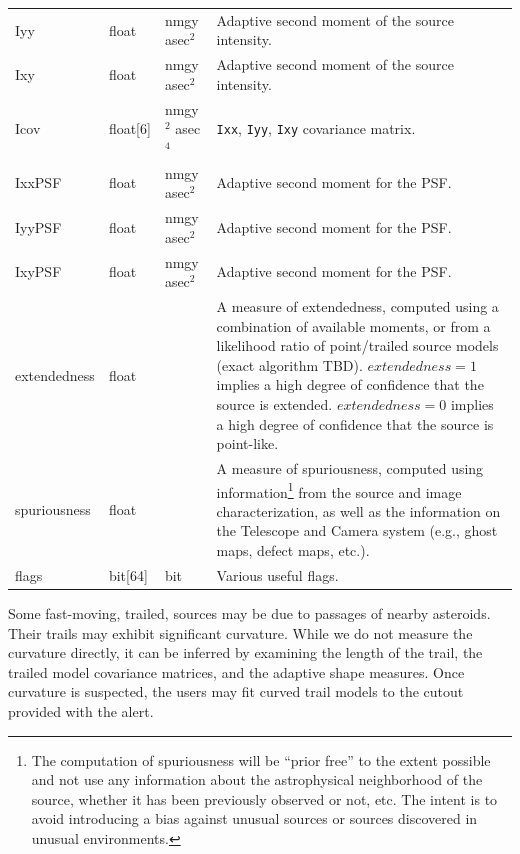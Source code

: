 \documentclass[12pt]{article}
\begin{document}
\begin{center}
\begin{longtable}{p{3cm}p{2cm}p{2cm}p{5cm}}
Iyy & float & nmgy asec$^{2}$ & Adaptive second moment of the source intensity. \\

Ixy & float & nmgy asec$^{2}$ & Adaptive second moment of the source intensity. \\

Icov & float[6] & nmgy$^{2}$ asec$^{4}$ & {\tt Ixx}, {\tt Iyy}, {\tt Ixy} covariance matrix. \\

IxxPSF & float & nmgy asec$^{2}$ & Adaptive second moment for the PSF. \\

IyyPSF & float & nmgy asec$^{2}$ & Adaptive second moment for the PSF. \\

IxyPSF & float & nmgy asec$^{2}$ & Adaptive second moment for the PSF. \\

extendedness & float & ~ & A measure of extendedness, computed using a combination of available moments, or from a likelihood ratio of point/trailed source models (exact algorithm TBD). $extendedness=1$ implies a high degree of confidence that the source is extended. $extendedness=0$ implies a high degree of confidence that the source is point-like. \\

spuriousness & float & ~ & A measure of spuriousness, computed using information\footnote{The computation
of spuriousness will be “prior free” to the extent possible and not use any information about the astrophysical neighborhood of the source, whether it has been previously observed or not, etc. The intent is to avoid introducing
a bias against unusual sources or sources discovered in unusual environments.}
from the source and image characterization, as well as the information on the Telescope and Camera system
(e.g., ghost maps, defect maps, etc.).
\\

flags & bit[64] & bit & Various useful flags.  \\ \hline
\end{longtable}
\end{center}

Some fast-moving, trailed, sources may be due to passages of nearby asteroids. Their trails may exhibit significant curvature.
While we do not measure the curvature directly, it can be inferred by examining the length of the trail, the trailed model covariance matrices, and the adaptive shape measures. Once curvature is suspected, the users may fit curved trail models to the cutout provided with the alert.
\end{document}
